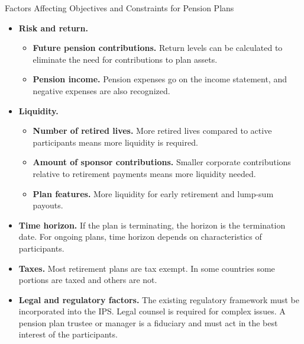 \documentclass[../custom]{flashcards}
\begin{document}
\begin{flashcard}[\studyArea]{Factors Affecting Objectives and Constraints for Pension Plans}
    \begin{itemize}[itemsep=.2\itemsep]
        \item \textbf{Risk and return.}
            \begin{itemize}
                \item \textbf{Future pension contributions.} Return levels can be calculated to eliminate the need for contributions to plan assets.
                \item \textbf{Pension income.} Pension expenses go on the income statement, and negative expenses are also recognized.
            \end{itemize}
        \item \textbf{Liquidity.}
            \begin{itemize}
                \item \textbf{Number of retired lives.} More retired lives compared to active participants means more liquidity is required.
                \item \textbf{Amount of sponsor contributions.} Smaller corporate contributions relative to retirement payments means more liquidity needed.
                \item \textbf{Plan features.} More liquidity for early retirement and lump-sum payouts.
            \end{itemize}
        \item \textbf{Time horizon.} If the plan is terminating, the horizon is the termination date. For ongoing plans, time horizon depends on characteristics of participants.
        \item \textbf{Taxes.} Most retirement plans are tax exempt. In some countries some portions are taxed and others are not.
        \item \textbf{Legal and regulatory factors.} The existing regulatory framework must be incorporated into the IPS\@. Legal counsel is required for complex issues. A pension plan trustee or manager is a fiduciary and must act in the best interest of the participants.
    \end{itemize}
\end{flashcard}
\end{document}
